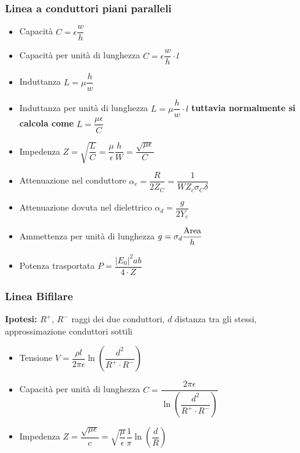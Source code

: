 \documentclass{article}
\begin{document}
\subsubsection{Linea a conduttori piani paralleli}
\begin{itemize}
	\item Capacità \( C = \epsilon \dfrac{w}{h} \)
	\item Capacità per unità di lunghezza \( C = \epsilon \dfrac{w}{h} \cdot l \)
	\item Induttanza \( L = \mu \dfrac{h}{w} \)
	\item Induttanza per unità di lunghezza \( L = \mu \dfrac{h}{w} \cdot l \) \textbf{tuttavia normalmente si calcola come} \( L = \dfrac{\mu \epsilon}{C} \)
	\item Impedenza \( Z = \sqrt{\dfrac{L}{C}} = \dfrac{\mu}{\epsilon} \dfrac{h}{W} = \dfrac{\sqrt{\mu \epsilon}}{C} \)
	\item Attenuazione nel conduttore \( \alpha_c = \dfrac{R}{2 Z_C} = \dfrac{1}{W Z_c \sigma_C \delta} \)
	\item Attenuazione dovuta nel dielettrico \( \alpha_d = \dfrac{g}{2 Y_c} \)
	\item Ammettenza per unità di lunghezza \( g = \sigma_d \dfrac{\textnormal{Area}}{h}\)
	\item Potenza trasportata \( P = \dfrac{|E_0|^2 a b}{4 \cdot Z} \)
\end{itemize}

\subsubsection{Linea Bifilare}
\textbf{Ipotesi:} \(R^+\), \(R^-\) raggi dei due conduttori, \(d\) distanza tra gli stessi, approssimazione conduttori sottili
\begin{itemize}
	\item Tensione \(V = \dfrac{\rho l}{2 \pi \epsilon} \ln \left( \dfrac{d^2}{R^+ \cdot R^-}\right) \)
	\item Capacità per unità di lunghezza \( C = \dfrac{2 \pi \epsilon}{\ln \left( \dfrac{d^2}{R^+ \cdot R^-}\right)} \)
	\item Impedenza \( Z = \dfrac{\sqrt{\mu \epsilon}}{c} = \sqrt{\dfrac{\mu}{\epsilon}} \dfrac{1}{\pi} \ln \left( \dfrac{d}{R} \right) \)
\end{itemize}
\end{document}
